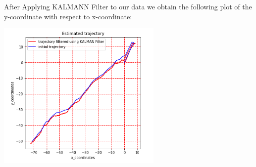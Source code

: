 \documentclass[12pt,a4paper]{report}
\begin{document}
After Applying KALMANN Filter to our data we obtain the following plot of the y-coordinate with respect to x-coordinate:
\begin{center}
\includegraphics[width=8cm]{Capture3.png}
\end{center}
\end{document}
